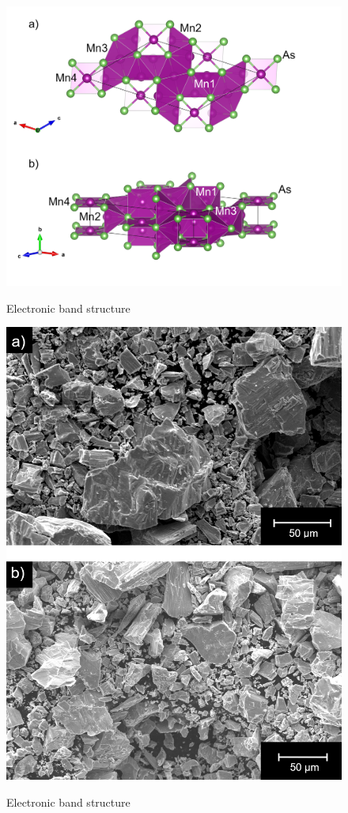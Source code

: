 \documentclass[11pt,edeposit,draftthesis]{uiucthesis2020}
\begin{document}
\begin{mainmatter}
\begin{figure}
\centering\includegraphics[width=\columnwidth]{figures/ch6/monoclinic_Mn3As2_75510.png} \\
\caption{\label{fig:Mn3As2}
Electronic band structure
}
\end{figure}

\begin{figure}
\centering\includegraphics[width=0.5\columnwidth]{figures/ch6/Mn3As2_SEM_image.png} \\
\caption{\label{fig:Mn3As2_SEM}
Electronic band structure
}
\end{figure}


\end{mainmatter}
\end{document}
